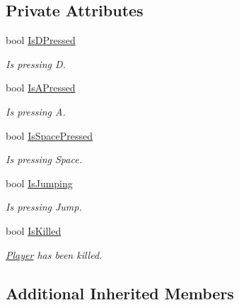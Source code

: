 \subsection*{Private Attributes}
\begin{DoxyCompactItemize}
\item 
\mbox{\label{class_player_a9cd46c1428e2a6fb38916a40ee5ef548}} 
bool \hyperlink{class_player_a9cd46c1428e2a6fb38916a40ee5ef548}{Is\+D\+Pressed}
\begin{DoxyCompactList}\small\item\em Is pressing D. \end{DoxyCompactList}\item 
\mbox{\label{class_player_a0db9d1d1eca744553f298f9a6b858985}} 
bool \hyperlink{class_player_a0db9d1d1eca744553f298f9a6b858985}{Is\+A\+Pressed}
\begin{DoxyCompactList}\small\item\em Is pressing A. \end{DoxyCompactList}\item 
\mbox{\label{class_player_ac6445d1f4bc026b52af1b8ce34bb34c1}} 
bool \hyperlink{class_player_ac6445d1f4bc026b52af1b8ce34bb34c1}{Is\+Space\+Pressed}
\begin{DoxyCompactList}\small\item\em Is pressing Space. \end{DoxyCompactList}\item 
\mbox{\label{class_player_ac5df350bc9cfeff679e7e47392d120d9}} 
bool \hyperlink{class_player_ac5df350bc9cfeff679e7e47392d120d9}{Is\+Jumping}
\begin{DoxyCompactList}\small\item\em Is pressing Jump. \end{DoxyCompactList}\item 
\mbox{\label{class_player_a556019631efc3e7281bd3f9534f23ecd}} 
bool \hyperlink{class_player_a556019631efc3e7281bd3f9534f23ecd}{Is\+Killed}
\begin{DoxyCompactList}\small\item\em \hyperlink{class_player}{Player} has been killed. \end{DoxyCompactList}\end{DoxyCompactItemize}
\subsection*{Additional Inherited Members}


